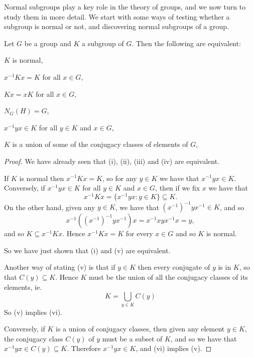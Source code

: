 Normal subgroups play a key role in the theory of groups, and we now turn to
study them in more detail.  We start with some ways of testing whether a
subgroup is normal or not, and discovering normal subgroups of a group.

\begin{theorem}
  Let $G$ be a group and $K$ a subgroup of $G$.  Then the following are
  equivalent:
  \begin{theoremenum}
    \item $K$ is normal,
    \item $x^{-1}Kx = K$ for all $x \in G$,
    \item $Kx = xK$ for all $x \in G$,
    \item $N_{G}(H) = G$,
    \item $x^{-1}yx \in K$ for all $y \in K$ and $x \in G$,
    \item $K$ is a union of some of the conjugacy classes of elements of $G$,
  \end{theoremenum}
\end{theorem}
\begin{proof}
  We have already seen that (i), (ii), (iii) and (iv) are equivalent.
  
  If $K$ is normal then $x^{-1}Kx = K$, so for any $y \in K$ we have that
  $x^{-1}yx \in K$.  Conversely, if $x^{-1}yx \in K$ for all $y \in
  K$ and $x \in G$, then if we fix $x$ we have that
  \[
    x^{-1}Kx = \{x^{-1}yx : y \in K\} \subseteq K.
  \]
  On the other hand, given any $y \in K$, we have that $(x^{-1})^{-1}yx^{-1}
  \in K$, and so
  \[
    x^{-1}((x^{-1})^{-1}yx^{-1})x = x^{-1}xyx^{-1}x = y,
  \]
  and so $K \subseteq x^{-1}Kx$.  Hence $x^{-1}Kx = K$ for every $x \in G$
  and so $K$ is normal.
  
  So we have just shown that (i) and (v) are equivalent.
  
  Another way of stating (v) is that if $y \in K$ then every conjugate of 
  $y$ is in $K$, so that $C(y) \subseteq K$.  Hence $K$ must be the union of
  all the conjugacy classes of its elements, ie.
  \[
    K = \bigcup_{y \in K} C(y)
  \]
  So (v) implies (vi).
  
  Conversely, if $K$ is a union of conjugacy classes, then given any element
  $y \in K$, the conjugacy class $C(y)$ of $y$ must be a subset of $K$, and
  so we have that $x^{-1}yx \in C(y) \subseteq K$.  Therefore $x^{-1}yx \in
  K$, and (vi) implies (v).
\end{proof}

